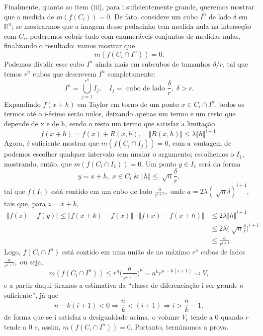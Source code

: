 \documentclass[../differential_topology.tex]{subfiles}
\begin{document}
\begin{proof*}
	Finalmente, quanto ao item (iii), para i suficientemente grande, queremos mostrar que a medida de \(m(f(C_{i})) = 0\). De fato, considere um cubo \(I^{n}\) de lado \(\delta \) em \(\mathbb{R}^{n}\); se mostrarmos que a imagem desse pedacinho tem medida nula na interseção com \(C_{i}\), poderemos cobrir tudo com enumeráveis conjuntos de medidas nulas, finalizando o resultado: vamos mostrar que
	\[
		m(f(C_{i}\cap I^{n}))=0.
	\]
	Podemos dividir esse cubo \(I^{n}\) ainda mais em subcubos de tamanhos \(\delta /r\), tal que temos \(r^{n}\) cubos que descrevem \(I^{n}\) completamente:
	\[
		I^{n} = \bigcup_{j=1}^{r^{n}}I_{j}, \quad I_{j} = \text{ cubo de lado }\frac{\delta }{r},\; \delta > r.
	\]
	Expandindo \(f(x+h)\) em Taylor em torno de um ponto \(x\in C_{i}\cap I^{n}\), todos os termos até o i-ésimo serão nulos, deixando apenas um termo e um resto que depende de x e de h, sendo o resto um termo que satisfaz a limitação
	\[
		f(x+h) = f(x) + R(x, h), \quad \Vert R(x, h) \Vert \leq \lambda \Vert h \Vert^{i+1}.
	\]
	Agora, é suficiente mostrar que \(m(f(C_{i}\cap I_{j}))=0\), com a vantagem de podemos escolher qualquer intervalo sem mudar o argumento; escolhemos o \(I_1\), mostrando, então, que \(m(f(C_{i}\cap I_{1}))=0\).
	Um ponto \(y\in I_{1}\) será da forma
	\[
		y = x+h,\; x\in C_{i} \;\&\; \Vert h \Vert\leq \sqrt[]{n} \frac{\delta }{r},
	\]
	tal que \(f(I_1)\) está contido em um cubo de lado \(\frac{a}{r^{i+1}},\) onde \(a = 2\lambda (\sqrt[]{n}\delta )^{i+1}\), tais que, para \(z=x+k\),
	\begin{align*}
		\Vert f(z) - f(y) \Vert \leq \Vert f(x+k) - f(x) \Vert + \Vert f(x) - f(x+h) \Vert & \leq 2\lambda \Vert h \Vert^{i+1}                             \\
		                                                                                   & \leq 2\lambda \biggl(\sqrt[]{n}\frac{\delta }{r}\biggr)^{i+1} \\
		                                                                                   & \leq \frac{a}{r^{i+1}}.
	\end{align*}
	Logo, \(f(C_{i}\cap I^{n})\) está contido em uma união de no máximo \(r^{n}\) cubos de lados \(\frac{a}{r^{i+1}},\) ou seja,
	\[
		m(f(C_{i}\cap I^{n})) \leq r^{n}\biggl(\frac{a}{r^{i+1}}\biggr)^{k} = a^{k}r^{n-k(i+1)} \eqqcolon V,
	\]
	e a partir daqui tiramos a estimativa da ``classe de diferenciação i ser grande o suficiente'', já que
	\[
		n-k(i+1)<0 \Rightarrow \frac{n}{k} < (i+1) \Rightarrow i > \frac{n}{k}-1,
	\]
	de forma que se i satisfaz a desigualdade acima, o volume \(V_{i}\) tende a 0 quando \(r\) tende a 0 e, assim, \(m(f(C_{i}\cap I^{n})) = 0\). Portanto, terminamos a prova. \qedsymbol
\end{proof*}
\end{document}
